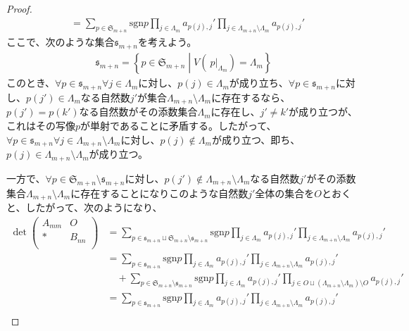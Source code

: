 \documentclass[dvipdfmx]{jsarticle}
\begin{document}
\begin{proof}
\begin{align*}
&= \sum_{p \in \mathfrak{S}_{m + n}} {{\mathrm{sgn} }p\prod_{j \in \varLambda_{m}} a_{p(j),j}'\prod_{j \in \varLambda_{m + n} \setminus \varLambda_{m}} a_{p(j),j}'}
\end{align*}
ここで、次のような集合$\mathfrak{s}_{m + n}$を考えよう。
\begin{align*}
\mathfrak{s}_{m + n} = \left\{ p \in \mathfrak{S}_{m + n} \middle| V\left( \left. \ p \right|_{\varLambda_{m}} \right) = \varLambda_{m} \right\}
\end{align*}
このとき、$\forall p \in \mathfrak{s}_{m + n}\forall j \in \varLambda_{m}$に対し、$p(j) \in \varLambda_{m}$が成り立ち、$\forall p \in \mathfrak{s}_{m + n}$に対し、$p\left( j' \right) \in \varLambda_{m}$なる自然数$j'$が集合$\varLambda_{m + n} \setminus \varLambda_{m}$に存在するなら、$p\left( j' \right) = p\left( k' \right)$なる自然数がその添数集合$\varLambda_{m}$に存在し、$j' \neq k'$が成り立つが、これはその写像$p$が単射であることに矛盾する。したがって、$\forall p \in \mathfrak{s}_{m + n}\forall j \in \varLambda_{m + n} \setminus \varLambda_{m}$に対し、$p(j) \notin \varLambda_{m}$が成り立つ、即ち、$p(j) \in \varLambda_{m + n} \setminus \varLambda_{m}$が成り立つ。\par
一方で、$\forall p \in \mathfrak{S}_{m + n} \setminus \mathfrak{s}_{m + n}$に対し、$p\left( j' \right) \notin \varLambda_{m + n} \setminus \varLambda_{m}$なる自然数$j'$がその添数集合$\varLambda_{m + n} \setminus \varLambda_{m}$に存在することになりこのような自然数$j'$全体の集合を$O$とおくと、したがって、次のようになり、
\begin{align*}
\det\begin{pmatrix}
A_{mm} & O \\
* & B_{nn} \\
\end{pmatrix} &= \sum_{p \in \mathfrak{s}_{m + n} \sqcup \mathfrak{S}_{m + n} \setminus \mathfrak{s}_{m + n}} {{\mathrm{sgn} }p\prod_{j \in \varLambda_{m}} a_{p(j),j}'\prod_{j \in \varLambda_{m + n} \setminus \varLambda_{m}} a_{p(j),j}'}\\
&= \sum_{p \in \mathfrak{s}_{m + n}} {{\mathrm{sgn} }p\prod_{j \in \varLambda_{m}} a_{p(j),j}'\prod_{j \in \varLambda_{m + n} \setminus \varLambda_{m}} a_{p(j),j}'} \\
&\quad + \sum_{p \in \mathfrak{S}_{m + n} \setminus \mathfrak{s}_{m + n}} {{\mathrm{sgn} }p\prod_{j \in \varLambda_{m}} a_{p(j),j}'\prod_{j \in O \sqcup \left( \varLambda_{m + n} \setminus \varLambda_{m} \right) \setminus O} a_{p(j),j}'}\\
&= \sum_{p \in \mathfrak{s}_{m + n}} {{\mathrm{sgn} }p\prod_{j \in \varLambda_{m}} a_{p(j),j}'\prod_{j \in \varLambda_{m + n} \setminus \varLambda_{m}} a_{p(j),j}'} \\

\end{align*}
\end{proof}
\end{document}

